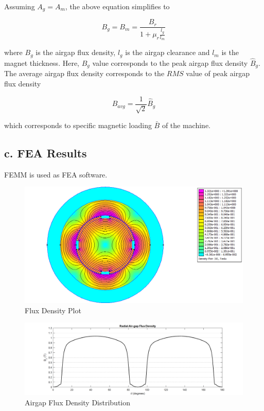 \documentclass[a4paper, 11pt, titlepage]{article}
\begin{document}
Assuming $A_g = A_m$, the above equation simplifies to

\begin{equation}
	B_g = B_m = \frac{B_r}{1+\mu_r\frac{l_g}{l_m}}
\end{equation}

where $B_g$ is the airgap flux density, $l_g$ is the airgap clearance and $l_m$ is the magnet thickness. Here, $B_g$ value corresponds to the peak airgap flux density $\hat{B}_g$. The average airgap flux density corresponds to the $RMS$ value of peak airgap flux density

\begin{equation}
	B_{avg} = \frac{1}{\sqrt{2}}\hat{B}_g
	\label{label:}
\end{equation}

which corresponds to specific magnetic loading $\bar{B}$ of the machine.


\subsection{c. FEA Results}

FEMM is used as FEA software.

\begin{figure}[h]
	\includegraphics[width=\textwidth]{fluxDensity.png}
	\caption{Flux Density Plot}
	\label{fig:Bplot}
\end{figure}

\begin{figure}[h]
	\includegraphics[width=\textwidth]{airgapFluxDensity.png}
	\caption{Airgap Flux Density Distribution}
	\label{fig:airgapBplot}
\end{figure}
\end{document}
